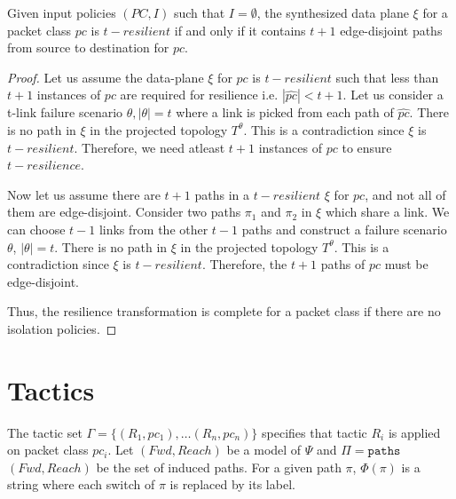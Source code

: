 \begin{theorem}[Completeness]
Given input policies $(PC,I)$ such that $I=\emptyset$,
the synthesized data plane $\xi$ for a packet class $pc$  
is $t-resilient$ if and only if it 
contains $t + 1$ edge-disjoint paths from source to destination
for $pc$.
	\end{theorem}
	\begin{proof}
		Let us assume the data-plane $\xi$ for $pc$ is $t-resilient$ such 
		that less than $t+1$ instances of $pc$ are required for resilience i.e. 
		$|\hat{pc}| < t+1$. Let us consider a 
		t-link failure scenario $\theta, |\theta| = t$ where a link is picked from
		each path of $\hat{pc}$. There is no path in $\xi$ in the projected
		topology $T^\theta$. This is a contradiction since $\xi$ is $t-resilient$. 
		Therefore, we need atleast $t+1$ instances of $pc$ to ensure $t-resilience$.
		
		Now let us assume there are $t+1$ paths in a $t-resilient$ $\xi$ for $pc$,
		and not all of them are edge-disjoint. Consider two paths $\pi_1$ and $\pi_2$
		in $\xi$ which share a link. We can choose $t-1$ links from the other $t-1$ paths 
		and construct a failure scenario $\theta$, $|\theta| = t$. 
		There is no path in $\xi$ in the projected
		topology $T^\theta$. This is a contradiction since $\xi$ is $t-resilient$. Therefore,
		the $t+1$ paths of $pc$ must be edge-disjoint. 
		
		\noindent Thus, the resilience transformation is complete for a  
		packet class if there are no isolation policies.
		\end{proof}


\section{Tactics} \label{app:tactics}
The tactic set $\Gamma = \{(R_1, pc_1), \ldots (R_n, pc_n)\}$
specifies that tactic $R_i$ is applied on packet class $pc_i$.
Let $(Fwd, Reach)$ be a model of $\Psi$ 
and $\Pi = \texttt{paths}$ $(Fwd, Reach)$
be the set of induced paths. For a given path $\pi$,
$\Phi(\pi)$ is a string where each switch of $\pi$ is replaced
by its label. 

